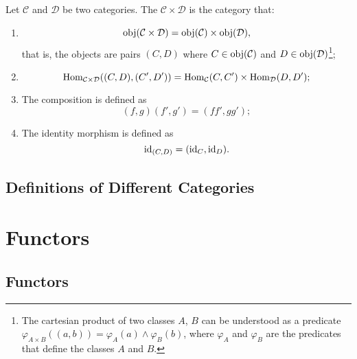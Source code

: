 \documentclass[openany, a5paper]{book}
\begin{document}
\begin{definition}
	Let $\mathcal C$ and $\mathcal D$ be two categories.
	The  $\mathcal C \times \mathcal D$ is the category that:
	\begin{enumerate}
		\item \begin{equation}
			\operatorname{obj}(\mathcal C \times \mathcal D) = \operatorname{obj}(\mathcal C) \times \operatorname{obj}(\mathcal D),
		\end{equation}
		that is, the objects are pairs $(C, D)$ where $C \in \operatorname{obj}(\mathcal C)$ and $D \in \operatorname{obj}(\mathcal D)$\footnote{%
			The cartesian product of two classes $A$, $B$ can be understood as a predicate $\varphi_{A \times B}((a, b)) = \varphi_A(a) \wedge \varphi_B(b)$, where $\varphi_A$ and $\varphi_B$ are the predicates that define the classes $A$ and $B$. 
		};
		\item \begin{equation}
			\operatorname{Hom}_{\mathcal C \times \mathcal D}((C, D), (C', D')) 
				= \operatorname{Hom}_{\mathcal C}(C, C') \times \operatorname{Hom}_{\mathcal D}(D, D');
		\end{equation}
		\item The composition is defined as
		\begin{equation}
			(f, g) (f', g') = (f f', g g');
		\end{equation}
		\item The identity morphism is defined as
		\begin{equation}
			\operatorname{id}_{(C, D)} = (\operatorname{id}_C, \operatorname{id}_D).
		\end{equation}
	\end{enumerate}
	
\end{definition}

\section{Definitions of Different Categories}

\chapter{Functors}
\section{Functors}
\end{document}
